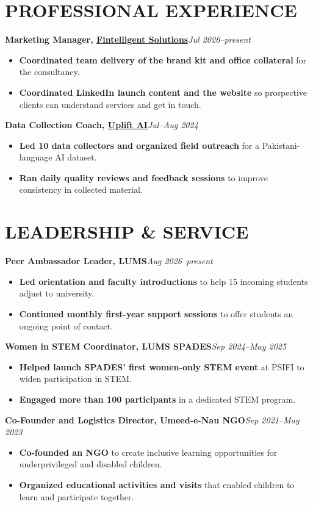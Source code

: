 \documentclass[9pt]{article}
\newcommand{\entry}[3]{\textbf{#1}\hfill {\small\itshape #2}\\[-2pt]{#3}\par}
\begin{document}
\section*{PROFESSIONAL EXPERIENCE}
\entry{Marketing Manager, \href{https://www.fintelligent.cc/}{Fintelligent Solutions}}{Jul 2026--present}{}
\begin{itemize}
\item \textbf{Coordinated team delivery of the brand kit and office collateral} for the consultancy.
\item \textbf{Coordinated LinkedIn launch content and the website} so prospective clients can understand services and get in touch.
\end{itemize}
\entry{Data Collection Coach, \href{https://upliftai.org/}{Uplift AI}}{Jul--Aug 2024}{}
\begin{itemize}
\item \textbf{Led 10 data collectors and organized field outreach} for a Pakistani-language AI dataset.
\item \textbf{Ran daily quality reviews and feedback sessions} to improve consistency in collected material.
\end{itemize}
\section*{LEADERSHIP \& SERVICE}
\entry{Peer Ambassador Leader, LUMS}{Aug 2026--present}{}
\begin{itemize}
\item \textbf{Led orientation and faculty introductions} to help 15 incoming students adjust to university.
\item \textbf{Continued monthly first-year support sessions} to offer students an ongoing point of contact.
\end{itemize}
\entry{Women in STEM Coordinator, LUMS SPADES}{Sep 2024--May 2025}{}
\begin{itemize}
\item \textbf{Helped launch SPADES' first women-only STEM event} at PSIFI to widen participation in STEM.
\item \textbf{Engaged more than 100 participants} in a dedicated STEM program.
\end{itemize}
\entry{Co-Founder and Logistics Director, Umeed-e-Nau NGO}{Sep 2021--May 2023}{}
\begin{itemize}
\item \textbf{Co-founded an NGO} to create inclusive learning opportunities for underprivileged and disabled children.
\item \textbf{Organized educational activities and visits} that enabled children to learn and participate together.
\end{itemize}
\end{document}
